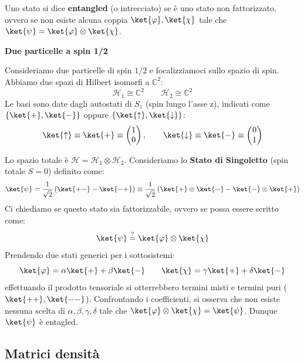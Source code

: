 \begin{definition}
    Uno stato si dice \textbf{entangled} (o intrecciato) se è uno stato non fattorizzato, ovvero se non esiste alcuna coppia \( \ket{\varphi}, \ket{\chi} \) tale che \( \ket{\psi} = \ket{\varphi} \otimes \ket{\chi} \).
\end{definition}

\begin{example}
    \textbf{Due particelle a spin 1/2}

    Consideriamo due particelle di spin \( 1/2 \) e focalizziamoci sullo spazio di spin.
    Abbiamo due spazi di Hilbert isomorfi a \( \mathbb{C}^2 \):
    \[
        \mathcal{H}_1 \cong \mathbb{C}^2 \qquad \mathcal{H}_2 \cong \mathbb{C}^2
    \]
    Le basi sono date dagli autostati di \( S_z \) (spin lungo l'asse z), indicati come \( \{\ket{+}, \ket{-}\} \) oppure \( \{\ket{\uparrow}, \ket{\downarrow}\} \):
    \[
        \ket{\uparrow} \equiv \ket{+} \equiv \begin{pmatrix} 1 \\ 0 \end{pmatrix}, \qquad \ket{\downarrow} \equiv \ket{-} \equiv \begin{pmatrix} 0 \\ 1 \end{pmatrix}
    \]

    Lo spazio totale è \( \mathcal{H} = \mathcal{H}_1 \otimes \mathcal{H}_2 \).
    Consideriamo lo \textbf{Stato di Singoletto} (spin totale \( S=0 \)) definito come:
    \[
        \ket{\psi} = \frac{1}{\sqrt{2}} \left( \ket{+ -} - \ket{- +} \right) \equiv \frac{1}{\sqrt{2}} \left( \ket{+} \otimes \ket{-} - \ket{-} \otimes \ket{+} \right)
    \]
    Ci chiediamo se questo stato sia fattorizzabile, ovvero se possa essere scritto come:
    \[
        \ket{\psi} \overset{?}{=} \ket{\varphi} \otimes \ket{\chi}
    \]
    Prendendo due stati generici per i sottosistemi:
    \[
        \ket{\varphi} = \alpha\ket{+} + \beta\ket{-} \qquad \ket{\chi} = \gamma\ket{+} + \delta\ket{-}
    \]
    effettuando il prodotto tensoriale si otterrebbero termini misti e termini puri (\( \ket{++}, \ket{--} \)). Confrontando i coefficienti, si osserva che non esiste nessuna scelta di \( \alpha, \beta, \gamma, \delta \) tale che \( \ket{\varphi} \otimes \ket{\chi} = \ket{\psi} \). Dunque \(\ket{\psi}\) è entagled.   
\end{example}

\subsection{Matrici densità}

